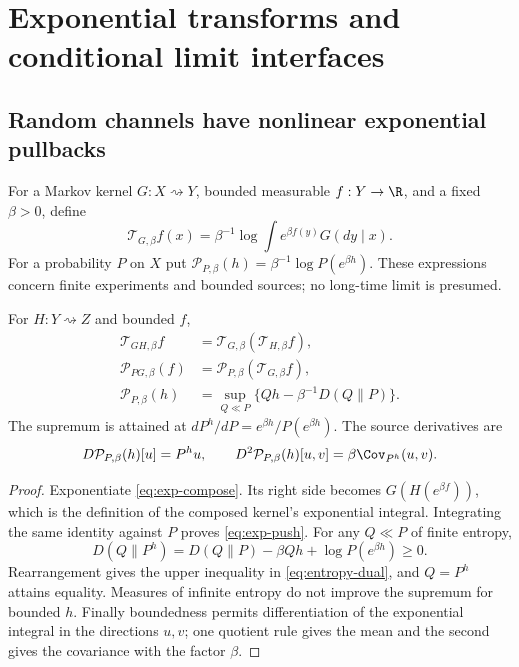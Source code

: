 \section{Exponential transforms and conditional limit interfaces}\label{sec:pressure}
\subsection{Random channels have nonlinear exponential pullbacks}
For a Markov kernel $G:X\rightsquigarrow Y$, bounded measurable $f:Y\to\R$,
and a fixed $\beta>0$, define
\begin{equation}\label{eq:exponential-pullback}
 \mathcal T_{G,\beta}f(x)
 =\beta^{-1}\log\int e^{\beta f(y)}G(dy\mid x).
\end{equation}
For a probability $P$ on $X$ put
$\mathcal P_{P,\beta}(h)=\beta^{-1}\log P(e^{\beta h})$.
These expressions concern finite experiments and bounded sources; no
long-time limit is presumed.

\begin{theorem}
\label{thm:pressure}
For $H:Y\rightsquigarrow Z$ and bounded $f$,
\begin{align}
 \mathcal T_{GH,\beta}f
 &=\mathcal T_{G,\beta}(\mathcal T_{H,\beta}f),\label{eq:exp-compose}\\
 \mathcal P_{PG,\beta}(f)
 &=\mathcal P_{P,\beta}(\mathcal T_{G,\beta}f),\label{eq:exp-push}\\
 \mathcal P_{P,\beta}(h)
 &=\sup_{Q\ll P}\{Qh-\beta^{-1}D(Q\|P)\}.
 \label{eq:entropy-dual}
\end{align}
The supremum is attained at
$dP^h/dP=e^{\beta h}/P(e^{\beta h})$. The source derivatives are
\begin{equation}\label{eq:pressure-derivative}
 D\mathcal P_{P,\beta}(h)[u]=P^hu,
 \qquad
 D^2\mathcal P_{P,\beta}(h)[u,v]
 =\beta\Cov_{P^h}(u,v).
\end{equation}
\end{theorem}
\begin{proof}
Exponentiate \eqref{eq:exp-compose}. Its right side becomes
$G(H(e^{\beta f}))$, which is the definition of the composed kernel's
exponential integral. Integrating the same identity against $P$ proves
\eqref{eq:exp-push}. For any $Q\ll P$ of finite entropy,
\[
 D(Q\|P^h)=D(Q\|P)-\beta Qh+\log P(e^{\beta h})\ge0.
\]
Rearrangement gives the upper inequality in \eqref{eq:entropy-dual}, and
$Q=P^h$ attains equality. Measures of infinite entropy do not improve the
supremum for bounded $h$. Finally boundedness permits differentiation of
the exponential integral in the directions $u,v$; one quotient rule gives
the mean and the second gives the covariance with the factor $\beta$.
\end{proof}

